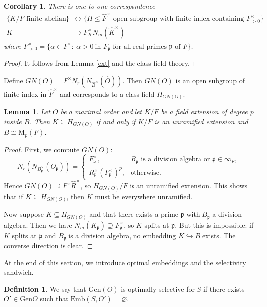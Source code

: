 \documentclass[12pt]{article}
\theoremstyle{plain}
\newtheorem{corollary}[theorem]{Corollary}
\newtheorem{lemma}[theorem]{Lemma}
\theoremstyle{definition}
\newtheorem{definition}{Definition}[section]
\theoremstyle{remark}
\begin{document}
\begin{corollary}
There is one to one correspondence 
\begin{align*}
\{K/F \text{ finite abelian}\}&\longleftrightarrow \{H\leq \widehat{F}^\times \text{ open subgroup with finite index containing }F^\times_{>0}\}\\
K &\to F^\times_{K} N_m(\widehat{K}^\times)
\end{align*}
where $F^\times_{>0}=\{ \alpha\in F^\times: \ \alpha>0 \ \text{in $F_\mathfrak{p}$ for all real primes $\mathfrak{p}$ of $F$} \}$. 
\end{corollary}
\begin{proof} It follows from Lemma \ref{ext} and the class field theory.
\end{proof}
Define $GN(O)=F^\times N_r(N_{\widehat{B}^\times}(\widehat{O}))$. Then $GN(O)$ is an open subgroup of finite index in $\widehat{F}^\times$ and corresponds to a class field $H_{GN(O)}$. 
\begin{lemma}\label{GNO}
Let $O$ be a maximal order and let $K/F$ be a field extension of degree $p$ inside $B$. Then $K\subseteq H_{GN(O)}$ if and only if $K/F$ is an unramified extension and $B\cong \mathrm{M}_p(F)$.
\end{lemma}
\begin{proof}
First, we compute $GN(O)$:
$$ N_r(N_{B_{\mathfrak{p}}^\times}(O_\mathfrak{p}))= \begin{cases} F_{\mathfrak{p}}^\times, & \text{$B_\mathfrak{p}$ is a division algebra or $\mathfrak{p}\in\infty_F$}, \\
R_{\mathfrak{p}}^\times (F_{\mathfrak{p}}^\times)^p, & \text{otherwise}. \end{cases} $$
Hence $GN(O)\supseteq F^\times\widehat{R}^\times$, so $H_{GN(O)}/F$ is an unramified extension. This shows that if $K\subseteq H_{GN(O)}$, then $K$ must be everywhere unramified.

Now suppose $K\subseteq H_{GN(O)}$ and that there exists a prime $\mathfrak{p}$ with $B_\mathfrak{p}$ a division algebra. Then we have $N_m(K_\mathfrak{p})\supseteq F_{\mathfrak{p}}^\times$, so $K$ splits at $\mathfrak{p}$. But this is impossible: if $K$ splits at $\mathfrak{p}$ and $B_\mathfrak{p}$ is a division algebra, no embedding $K\hookrightarrow B$ exists. The converse direction is clear.
\end{proof}

At the end of this section, we introduce optimal embeddings and the selectivity sandwich.
\begin{definition} We say that $\mathrm{Gen} (O)$ is optimally selective for $S$ if there exists $O'\in\mathrm{Gen} O$ such that 
$\mathrm{Emb}(S,O')= \varnothing$. 
\end{definition}
\end{document}
